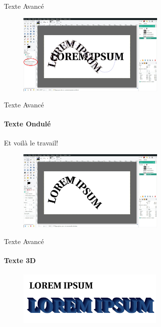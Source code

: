 \documentclass[10pt,svgnames,usenames,table]{beamer}
\begin{document}
\begin{frame}{Texte Avancé}
\begin{enumerate}
{			\begin{figure}
				\centering
				\includegraphics[height=150px]{Images/text/courb4}
			\end{figure}
		}
		\end{enumerate}
\end{frame}


\begin{frame}{Texte Avancé}
	\framesubtitle{Texte Ondulé}
	Et voilà le travail!
	\begin{figure}
	\centering
		\includegraphics[height=150px]{Images/text/courb5}
	\end{figure}
\end{frame}

\begin{frame}{Texte Avancé}
	\framesubtitle{Texte 3D}
	\begin{figure}
	\centering
	\includegraphics[height=100px]{Images/text/3D1}
	\end{figure}
\end{frame}
\end{document}
